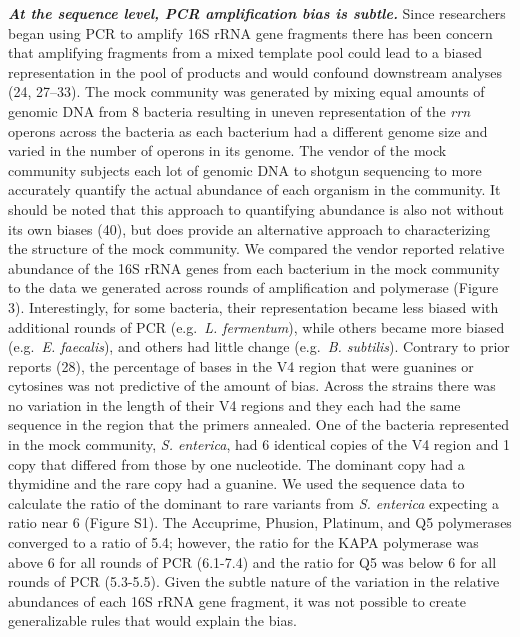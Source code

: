 \documentclass[11pt,]{article}
\begin{document}
\textbf{\emph{At the sequence level, PCR amplification bias is subtle.}}
Since researchers began using PCR to amplify 16S rRNA gene fragments
there has been concern that amplifying fragments from a mixed template
pool could lead to a biased representation in the pool of products and
would confound downstream analyses (24, 27--33). The mock community was
generated by mixing equal amounts of genomic DNA from 8 bacteria
resulting in uneven representation of the \emph{rrn} operons across the
bacteria as each bacterium had a different genome size and varied in the
number of operons in its genome. The vendor of the mock community
subjects each lot of genomic DNA to shotgun sequencing to more
accurately quantify the actual abundance of each organism in the
community. It should be noted that this approach to quantifying
abundance is also not without its own biases (40), but does provide an
alternative approach to characterizing the structure of the mock
community. We compared the vendor reported relative abundance of the 16S
rRNA genes from each bacterium in the mock community to the data we
generated across rounds of amplification and polymerase (Figure 3).
Interestingly, for some bacteria, their representation became less
biased with additional rounds of PCR (e.g.~\emph{L. fermentum}), while
others became more biased (e.g.~\emph{E. faecalis}), and others had
little change (e.g.~\emph{B. subtilis}). Contrary to prior reports (28),
the percentage of bases in the V4 region that were guanines or cytosines
was not predictive of the amount of bias. Across the strains there was
no variation in the length of their V4 regions and they each had the
same sequence in the region that the primers annealed. One of the
bacteria represented in the mock community, \emph{S. enterica}, had 6
identical copies of the V4 region and 1 copy that differed from those by
one nucleotide. The dominant copy had a thymidine and the rare copy had
a guanine. We used the sequence data to calculate the ratio of the
dominant to rare variants from \emph{S. enterica} expecting a ratio near
6 (Figure S1). The Accuprime, Phusion, Platinum, and Q5 polymerases
converged to a ratio of 5.4; however, the ratio for the KAPA polymerase
was above 6 for all rounds of PCR (6.1-7.4) and the ratio for Q5 was
below 6 for all rounds of PCR (5.3-5.5). Given the subtle nature of the
variation in the relative abundances of each 16S rRNA gene fragment, it
was not possible to create generalizable rules that would explain the
bias.
\end{document}
